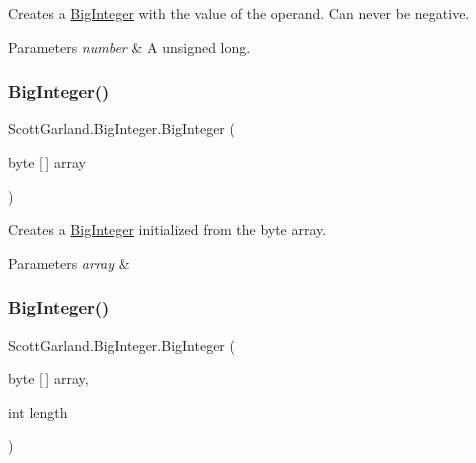 Creates a \hyperlink{class_scott_garland_1_1_big_integer}{Big\+Integer} with the value of the operand. Can never be negative. 


\begin{DoxyParams}{Parameters}
{\em number} & A unsigned long.\\
\hline
\end{DoxyParams}
\mbox{\label{class_scott_garland_1_1_big_integer_a780777418993360461e0fe7c46537860}} 
\subsubsection{\texorpdfstring{Big\+Integer()}{BigInteger()}\hspace{0.1cm}{\footnotesize\ttfamily [4/8]}}
{\footnotesize\ttfamily Scott\+Garland.\+Big\+Integer.\+Big\+Integer (\begin{DoxyParamCaption}\item[{byte \mbox{[}$\,$\mbox{]}}]{array }\end{DoxyParamCaption})\hspace{0.3cm}{\ttfamily [inline]}}



Creates a \hyperlink{class_scott_garland_1_1_big_integer}{Big\+Integer} initialized from the byte array. 


\begin{DoxyParams}{Parameters}
{\em array} & \\
\hline
\end{DoxyParams}
\mbox{\label{class_scott_garland_1_1_big_integer_a018f88f4c41760ccc0c7c76e1e6794a9}} 
\subsubsection{\texorpdfstring{Big\+Integer()}{BigInteger()}\hspace{0.1cm}{\footnotesize\ttfamily [5/8]}}
{\footnotesize\ttfamily Scott\+Garland.\+Big\+Integer.\+Big\+Integer (\begin{DoxyParamCaption}\item[{byte \mbox{[}$\,$\mbox{]}}]{array,  }\item[{int}]{length }\end{DoxyParamCaption})\hspace{0.3cm}{\ttfamily [inline]}}




